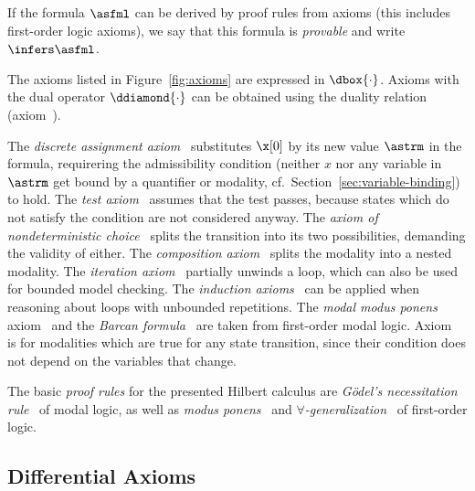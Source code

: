     If the \ddL formula $\asfml$ can be derived by \ddL proof rules from \ddL axioms (this includes first-order logic axioms), we say that this formula is \emph{provable} and write $\infers\asfml$.

    The axioms listed in Figure~\ref{fig:axioms} are expressed in $\dbox{\cdot}$. Axioms with the dual operator $\ddiamond{\cdot}$ can be obtained using the duality relation (axiom~).
    
    The \emph{discrete assignment axiom}~ substitutes $\x[0]$ by its new value $\astrm$ in the formula, requirering the admissibility condition (neither $x$ nor any variable in $\astrm$ get bound by a quantifier or modality, cf.~Section~\ref{sec:variable-binding}) to hold.
    The \emph{test axiom}~ assumes that the test passes, because states which do not satisfy the condition are not considered anyway.
    The \emph{axiom of nondeterministic choice}~ splits the transition into its two possibilities, demanding the validity of either. 
    The \emph{composition axiom}~ splits the modality into a nested modality.
    The \emph{iteration axiom}~ partially unwinds a loop, which can also be used for bounded model checking.
    The \emph{induction axioms}~
    can be applied when reasoning about loops with unbounded repetitions. 
    The \emph{modal modus ponens} axiom~ and the \emph{Barcan formula}~ are taken from first-order modal logic.
    Axiom~ is for modalities which are true for any state transition, since their condition does not depend on the variables that change.

    The basic \emph{proof rules} for the presented Hilbert calculus are \emph{Gödel's necessitation rule}~ of modal logic, as well as \emph{modus ponens}~ and \emph{$\forall$-generalization}~ of first-order logic.


    \subsection{Differential Axioms}
        \label{sec:differential-axioms}

